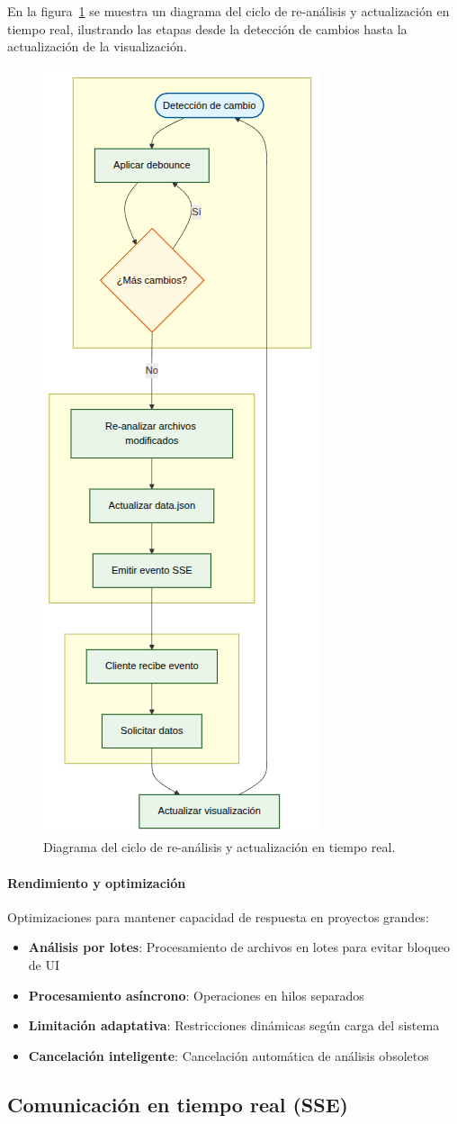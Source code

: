 \documentclass[a4paper, 12pt]{book}
\begin{document}
En la figura~\ref{fig:reanalisis-ciclo} se muestra un diagrama del ciclo de re-análisis y actualización en tiempo real, ilustrando las etapas desde la detección de cambios hasta la actualización de la visualización.

\begin{figure}[H]
\centering
\includegraphics[width=0.30\linewidth]{img/ciclo-reanalisis-tiempo-real.png}
\caption{Diagrama del ciclo de re-análisis y actualización en tiempo real.}
\label{fig:reanalisis-ciclo}
\end{figure}

\paragraph{Rendimiento y optimización}
Optimizaciones para mantener capacidad de respuesta en proyectos grandes:

\begin{itemize}
  \item \textbf{Análisis por lotes}: Procesamiento de archivos en lotes para evitar bloqueo de UI
  \item \textbf{Procesamiento asíncrono}: Operaciones en hilos separados
  \item \textbf{Limitación adaptativa}: Restricciones dinámicas según carga del sistema
  \item \textbf{Cancelación inteligente}: Cancelación automática de análisis obsoletos
\end{itemize}

\subsection{Comunicación en tiempo real (SSE)}
\label{sec:comunicacion-sse}
\end{document}
